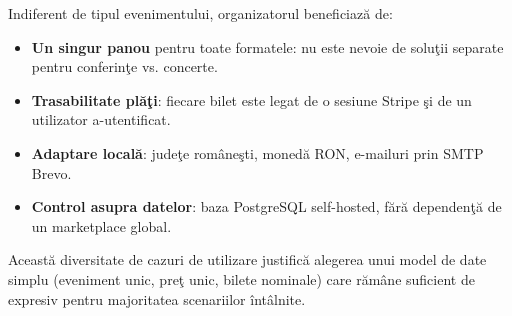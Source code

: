 Indiferent de tipul evenimentului, organizatorul beneficiaz\u a de: 

\begin{itemize}
	\item \textbf{Un singur panou} pentru toate formatele: nu este nevoie de solu\c tii separate pentru conferin\c te vs. concerte.
	\item \textbf{Trasabilitate pl\u a\c ti}: fiecare bilet este legat de o sesiune Stripe \c si de un utilizator a-utentificat.
	\item \textbf{Adaptare local\u a}: jude\c te rom\^ane\c sti, moned\u a RON, e-mailuri prin SMTP Brevo.
	\item \textbf{Control asupra datelor}: baza PostgreSQL self-hosted, f\u ar\u a dependen\c t\u a de un marketplace global.
\end{itemize}

\vspace{1em} %

Aceast\u a diversitate de cazuri de utilizare justific\u a alegerea unui model de date simplu (eveniment unic, pre\c t unic, bilete nominale) care r\u am\^ane suficient de expresiv pentru majoritatea scenariilor \^int\^alnite.